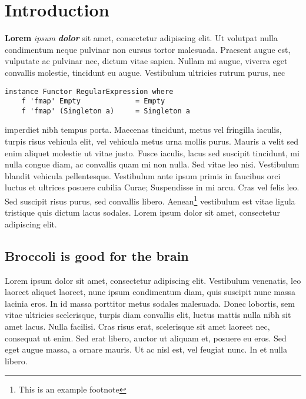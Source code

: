 \section{Introduction}

\textbf{Lorem} \emph{ipsum} \textbf{\emph{dolor}} sit amet, consectetur
adipiscing elit. Ut volutpat nulla condimentum neque pulvinar non cursus
tortor malesuada. Praesent augue est, vulputate ac pulvinar nec, dictum
vitae sapien. Nullam mi augue, viverra eget convallis molestie,
tincidunt eu augue. Vestibulum ultricies rutrum purus, nec

\begin{verbatim}
instance Functor RegularExpression where
    f 'fmap' Empty             = Empty
    f 'fmap' (Singleton a)     = Singleton a
\end{verbatim}
imperdiet nibh tempus porta. Maecenas tincidunt, metus vel fringilla
iaculis, turpis risus vehicula elit, vel vehicula metus urna mollis
purus. Mauris a velit sed enim aliquet molestie ut vitae justo. Fusce
iaculis, lacus sed suscipit tincidunt, mi nulla congue diam, ac
convallis quam mi non nulla. Sed vitae leo nisi. Vestibulum blandit
vehicula pellentesque. Vestibulum ante ipsum primis in faucibus orci
luctus et ultrices posuere cubilia Curae; Suspendisse in mi arcu. Cras
vel felis leo. Sed suscipit risus purus, sed convallis libero.
Aenean\footnote{This is an example footnote} vestibulum est vitae ligula
tristique quis dictum lacus sodales. Lorem ipsum dolor sit amet,
consectetur adipiscing elit.

\subsection{Broccoli is good for the brain}

Lorem ipsum dolor sit amet, consectetur adipiscing elit. Vestibulum
venenatis, leo laoreet aliquet laoreet, nunc ipsum condimentum diam,
quis suscipit nunc massa lacinia eros. In id massa porttitor metus
sodales malesuada. Donec lobortis, sem vitae ultricies scelerisque,
turpis diam convallis elit, luctus mattis nulla nibh sit amet lacus.
Nulla facilisi. Cras risus erat, scelerisque sit amet laoreet nec,
consequat ut enim. Sed erat libero, auctor ut aliquam et, posuere eu
eros. Sed eget augue massa, a ornare mauris. Ut ac nisl est, vel feugiat
nunc. In et nulla libero.

